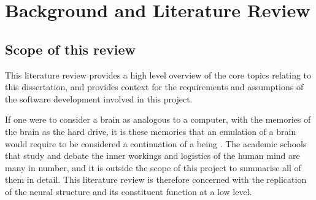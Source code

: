 \chapter{Background and Literature Review}


\section{Scope of this review}
This literature review provides a high level overview of the core topics relating to this dissertation, and provides context for the requirements and assumptions of the software development involved in this project. 

If one were to consider a brain as analogous to a computer, with the memories of
the brain as the hard drive, it is these memories that an  emulation of a brain
would require to be considered a continuation of a being
\autocite{eichenbaum_cognitive_2011}. The academic schools that study and debate
the inner workings and logistics of the human mind are many in number, and it is
outside the scope of this project to summarise all of them in detail.  This
literature review is therefore concerned with the replication of the neural
structure and its constituent function at a low level.








